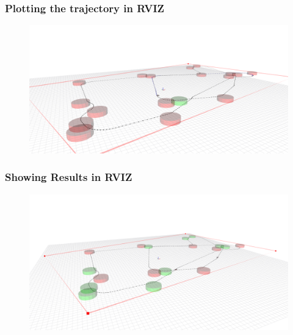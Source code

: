 \documentclass[aspectratio=1610]{beamer}
\begin{document}

  \begin{frame}
    \frametitle{Plotting the trajectory in RVIZ}

    \begin{figure}
      \includegraphics[width=1.0\textwidth]{fig/mtspn_task/rviz_1.png}
    \end{figure}

  \end{frame}



  \begin{frame}
    \frametitle{Showing Results in RVIZ}

    \begin{figure}
      \includegraphics[width=1.0\textwidth]{fig/mtspn_task/rviz_2.png}
    \end{figure}

  \end{frame}


\end{document}
